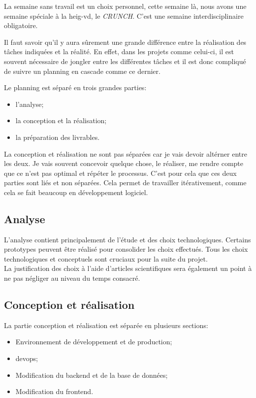\documentclass[
    iai, %
    il, %
]{heig-tb}
\begin{document}
La semaine sans travail est un choix personnel, cette semaine là, nous avons une semaine spéciale à la \Gls{heig-vd}, le \emph{CRUNCH}. C'est une semaine interdisciplinaire obligatoire.

Il faut savoir qu'il y aura sûrement une grande différence entre la réalisation des tâches indiquées
et la réalité. En effet, dans les projets comme celui-ci, il est souvent nécessaire de jongler entre
les différentes tâches et il est donc compliqué de suivre un planning en cascade comme ce dernier.

Le planning est séparé en trois grandes parties:
\begin{itemize}
    \item l'analyse;
    \item la conception et la réalisation;
    \item la préparation des livrables.
\end{itemize}

La conception et réalisation ne sont pas séparées car je vais devoir altérner entre les deux.
Je vais souvent concevoir quelque chose, le réaliser, me rendre compte que ce n'est
pas optimal et répéter le processus. C'est pour cela que ces deux parties sont liés et non séparées.
Cela permet de travailler itérativement, comme cela se fait beaucoup en développement logiciel.

\subsection{Analyse}
L'analyse contient principalement de l'étude et des choix technologiques. Certains prototypes peuvent être réalisé pour consolider les choix effectués. Tous les choix technologiques et conceptuels sont cruciaux pour la suite du projet.\\
La justification des choix à l'aide d'articles scientifiques sera également un point à ne pas négliger au niveau du temps consacré.

\subsection{Conception et réalisation}
La partie conception et réalisation est séparée en plusieurs sections:
\begin{itemize}
    \item Environnement de développement et de production;
    \item \Gls{devops};
    \item Modification du \Gls{backend} et de la base de données;
    \item Modification du \Gls{frontend}.
\end{itemize}
\end{document}
